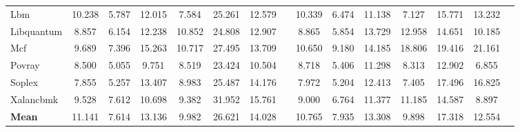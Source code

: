 \begin{table}
{\begin{tabular}{@{}l SSSSSS c@{\hspace{-0.9em}}  SSSSSS c   @{}}
    Lbm         &10.238&5.787 &12.015&7.584  &25.261&12.579&&10.339&6.474 &11.138&7.127 &15.771&13.232\\ %
    Libquantum  &8.857 &6.154 &12.238&10.852 &24.808&12.907&&8.865&5.854  &13.729&12.958&14.651&10.185\\ %
    Mcf         &9.689 &7.396 &15.263&10.717 &27.495&13.709&&10.650&9.180 &14.185&18.806&19.416&21.161\\ %
    Povray      &8.500 &5.055 &9.751&8.519   &23.424&10.504&&8.718&5.406  &11.298&8.313 &12.902&6.855 \\ %
    Soplex      &7.855 &5.257 &13.407&8.983  &25.487&14.176&&7.972&5.204  &12.413&7.405 &17.496&16.825\\ %
    Xalancbmk   &9.528 &7.612 &10.698&9.382  &31.952&15.761&&9.000&6.764  &11.377&11.185&14.587&8.897 \\ %
    {\bf Mean}      &11.141&7.614 &13.136&9.982  &26.621&14.028&&10.765&7.935 &13.308&9.898 &17.318&12.554\\ 
\bottomrule
\end{tabular}
}
\label{tab: Cl--States: PAAE, Standard deviation and Confidence for SPECcpu2006 benchmarks -- MIPS.}
\end{table}%

